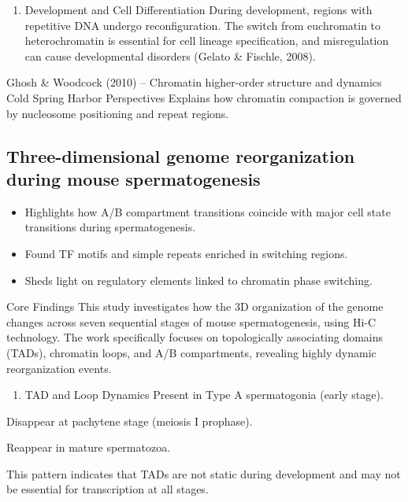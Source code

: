 \documentclass[
  a4paper,
]{scrbook}
\providecommand{\tightlist}{%
  \setlength{\itemsep}{0pt}\setlength{\parskip}{0pt}}
\begin{document}
\begin{enumerate}
\def\labelenumi{\arabic{enumi}.}
\setcounter{enumi}{3}
\tightlist
\item
  Development and Cell Differentiation During development, regions with
  repetitive DNA undergo reconfiguration. The switch from euchromatin to
  heterochromatin is essential for cell lineage specification, and
  misregulation can cause developmental disorders (Gelato \& Fischle,
  2008).
\end{enumerate}

Ghosh \& Woodcock (2010) -- Chromatin higher-order structure and
dynamics Cold Spring Harbor Perspectives Explains how chromatin
compaction is governed by nucleosome positioning and repeat regions.

\subsection{Three-dimensional genome reorganization during mouse
spermatogenesis}\label{three-dimensional-genome-reorganization-during-mouse-spermatogenesis}

\begin{itemize}
\tightlist
\item
  Highlights how A/B compartment transitions coincide with major cell
  state transitions during spermatogenesis.
\item
  Found TF motifs and simple repeats enriched in switching regions.
\item
  Sheds light on regulatory elements linked to chromatin phase
  switching.
\end{itemize}

Core Findings This study investigates how the 3D organization of the
genome changes across seven sequential stages of mouse spermatogenesis,
using Hi-C technology. The work specifically focuses on topologically
associating domains (TADs), chromatin loops, and A/B compartments,
revealing highly dynamic reorganization events.

\begin{enumerate}
\def\labelenumi{\arabic{enumi}.}
\tightlist
\item
  TAD and Loop Dynamics Present in Type A spermatogonia (early stage).
\end{enumerate}

Disappear at pachytene stage (meiosis I prophase).

Reappear in mature spermatozoa.

This pattern indicates that TADs are not static during development and
may not be essential for transcription at all stages.
\end{document}
